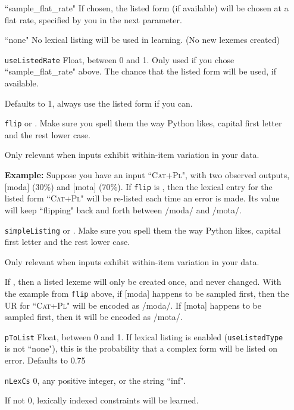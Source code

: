 \documentclass[12]{article}
\begin{document}
\begin{itemize}
	``sample\_flat\_rate"  If chosen, the listed form (if available) will be chosen at a flat rate, specified by you in the next parameter.
	
	``none"  No lexical listing will be used in learning.  (No new lexemes created)
	
	\item[\texttt{useListedRate}] Float, between 0 and 1.  Only used if you chose ``sample\_flat\_rate" above.  The chance that the listed form will be used, if available.
	
	Defaults to 1, always use the listed form if you can.
	
	\item[\texttt{flip}]   or .  Make sure you spell them the way Python likes, capital first letter and the rest lower case.
	
	Only relevant when inputs exhibit within-item variation in your data.  
	
	{\bf Example:} Suppose you have an input ``\textsc{Cat+Pl}", with two observed outputs, [moda] (30\%) and [mota] (70\%).  If \texttt{flip} is , then the lexical entry for the listed form ``\textsc{Cat+Pl}" will be re-listed each time an error is made.  Its value will keep ``flipping" back and forth between /moda/ and /mota/.
	
	\item[\texttt{simpleListing}] or .  Make sure you spell them the way Python likes, capital first letter and the rest lower case.
	
	Only relevant when inputs exhibit within-item variation in your data.  
	
	If , then a listed lexeme will only be created once, and never changed.  With the example from \texttt{flip} above, if [moda] happens to be sampled first, then the UR for ``\textsc{Cat+Pl}" will be encoded as /moda/.  If [mota] happens to be sampled first, then it will be encoded as /mota/.
	
	\item[\texttt{pToList}]  Float, between 0 and 1.  If lexical listing is enabled (\texttt{useListedType} is not ``none"), this is the probability that a complex form will be listed on error.  Defaults to 0.75
	
	\item[\texttt{nLexCs}] 0, any positive integer, or the string ``inf".  
	
	If not 0, lexically indexed constraints will be learned.
	

\end{itemize}
\end{document}
